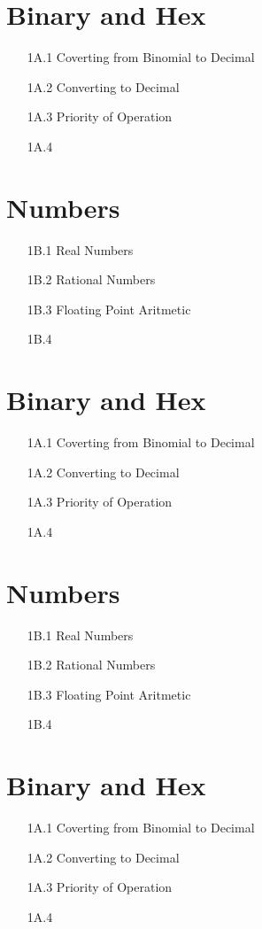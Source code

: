 \documentclass[12pt]{article}
\begin{document}
\section*{Binary and Hex}
\begin{itemize}
	\item[1A.1] Coverting from Binomial to Decimal
	\item[1A.2] Converting to Decimal
	\item[1A.3] Priority of Operation
	\item[1A.4] 
\end{itemize}

\section*{Numbers}
\begin{itemize}
	\item[1B.1] Real Numbers
	\item[1B.2] Rational Numbers
	\item[1B.3] Floating Point Aritmetic
	\item[1B.4] 
\end{itemize}
\section*{Binary and Hex}
\begin{itemize}
	\item[1A.1] Coverting from Binomial to Decimal
	\item[1A.2] Converting to Decimal
	\item[1A.3] Priority of Operation
	\item[1A.4] 
\end{itemize}
\section*{Numbers}
\begin{itemize}
	\item[1B.1] Real Numbers
	\item[1B.2] Rational Numbers
	\item[1B.3] Floating Point Aritmetic
	\item[1B.4] 
\end{itemize}
\section*{Binary and Hex}
\begin{itemize}
	\item[1A.1] Coverting from Binomial to Decimal
	\item[1A.2] Converting to Decimal
	\item[1A.3] Priority of Operation
	\item[1A.4] 
\end{itemize}
\newpage
\end{document}
